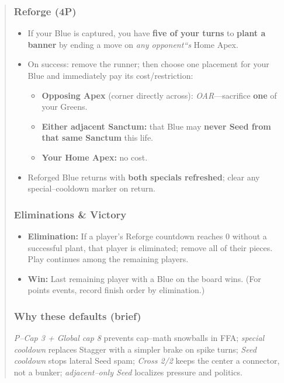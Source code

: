 \documentclass[11pt]{article}
\begin{document}
\begin{quote}
\subsubsection*{Reforge (4P)}
\begin{itemize}[leftmargin=1.3em,itemsep=0.25em]
  \item If your Blue is captured, you have \textbf{five of your turns} to \textbf{plant a banner} by ending a move on \emph{any opponent``s} Home Apex.
  \item On success: remove the runner; then choose one placement for your Blue and immediately pay its cost/restriction:
  \begin{itemize}[leftmargin=1.3em,itemsep=0.1em]
    \item \textbf{Opposing Apex} (corner directly across): \textit{OAR}---sacrifice \textbf{one} of your Greens.
    \item \textbf{Either adjacent Sanctum:} that Blue may \textbf{never Seed from that same Sanctum} this life.
    \item \textbf{Your Home Apex:} no cost.
  \end{itemize}
  \item Reforged Blue returns with \textbf{both specials refreshed}; clear any special--cooldown marker on return.
\end{itemize}

\subsubsection*{Eliminations \& Victory}
\begin{itemize}[leftmargin=1.3em,itemsep=0.25em]
  \item \textbf{Elimination:} If a player's Reforge countdown reaches 0 without a successful plant, that player is eliminated; remove all of their pieces. Play continues among the remaining players.
  \item \textbf{Win:} Last remaining player with a Blue on the board wins. (For points events, record finish order by elimination.)
\end{itemize}

\subsubsection*{Why these defaults (brief)}
\noindent \emph{P--Cap 3 + Global cap 8} prevents cap--math snowballs in FFA; \emph{special cooldown} replaces Stagger with a simpler brake on spike turns; \emph{Seed cooldown} stops lateral Seed spam; \emph{Cross 2/2} keeps the center a connector, not a bunker; \emph{adjacent--only Seed} localizes pressure and politics.


\end{quote}
\end{document}
